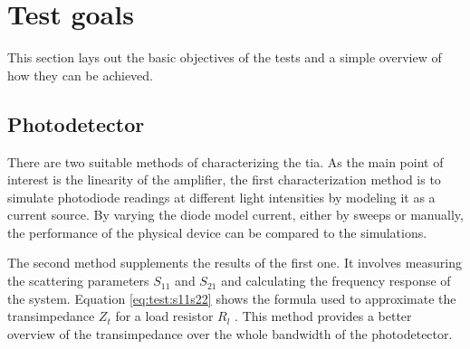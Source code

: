 


\section{Test goals}
This section lays out the basic objectives of the tests and a simple overview of how they can be achieved.

\subsection{Photodetector}
There are two suitable methods of characterizing the \gls{tia}. As the main point of interest is the linearity of the amplifier, the first characterization method is to simulate photodiode readings at different light intensities by modeling it as a current source. By varying the diode model current, either by sweeps or manually, the performance of the physical device can be compared to the simulations.

The second method supplements the results of the first one. It involves measuring the scattering parameters $S_{11}$ and $S_{21}$ and calculating the frequency response of the system. Equation \eqref{eq:test:s11s22} shows the formula used to approximate the transimpedance $Z_t$ for a load resistor $R_l$ \cite{sackinger2017analysis}. This method provides a better overview of the transimpedance over the whole bandwidth of the photodetector.

